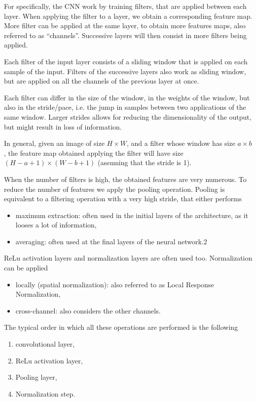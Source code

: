\documentclass[oneside,onecolumn]{report}
\begin{document}
For specifically, the CNN work by training filters, that are applied between each layer.
When applying the filter to a layer, we obtain a corresponding feature map.
More filter can be applied at the same layer, to obtain more features maps, also referred to as ``channels''.
Successive layers will then consist in more filters being applied.

Each filter of the input layer consists of a sliding window that is applied on each sample of the input.
Filters of the successive layers also work as sliding window, but are applied on all the channels of the previous layer at once.

Each filter can differ in the size of the window, in the weights of the window, but also in the stride/pace, i.e. the jump in samples between two applications of the same window.
Larger strides allows for reducing the dimensionality of the output, but might result in loss of information.

In general, given an image of size $H \times W$, and a filter whose window has size $a \times b$, the feature map obtained applying the filter will have size $(H - a + 1) \times (W - b + 1)$ (assuming that the stride is 1).

When the number of filters is high, the obtained features are very numerous.
To reduce the number of features we apply the pooling operation.
Pooling is equivalent to a filtering operation with a very high stride, that either performs
\begin{itemize}
    \item maximum extraction: often used in the initial layers of the architecture, as it looses a lot of information,
    \item averaging: often used at the final layers of the neural network.2
\end{itemize}

ReLu activation layers and normalization layers are often used too.
Normalization can be applied
\begin{itemize}
    \item locally (spatial normalization): also referred to as Local Response Normalization,
    \item cross-channel: also considers the other channels.
\end{itemize}

The typical order in which all these operations are performed is the following
\begin{enumerate}
    \item convolutional layer,
    \item ReLu activation layer,
    \item Pooling layer,
    \item Normalization step.
\end{enumerate}
\end{document}
